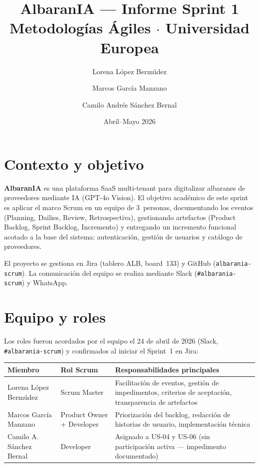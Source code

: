 \documentclass[11pt,a4paper]{article}
\title{\textbf{AlbaranIA} --- Informe Sprint 1 \\ \large Metodologías Ágiles $\cdot$ Universidad Europea}
\author{Lorena López Bermúdez \and Marcos García Manzano \and Camilo Andrés Sánchez Bernal}
\date{Abril--Mayo 2026}
\begin{document}
\maketitle

\section{Contexto y objetivo}

\textbf{AlbaranIA} es una plataforma SaaS multi-tenant para digitalizar albaranes de proveedores mediante IA (GPT-4o Vision). El objetivo académico de este sprint es aplicar el marco Scrum en un equipo de 3~personas, documentando los eventos (Planning, Dailies, Review, Retrospectiva), gestionando artefactos (Product Backlog, Sprint Backlog, Incremento) y entregando un incremento funcional acotado a la base del sistema: autenticación, gestión de usuarios y catálogo de proveedores.

El proyecto se gestiona en Jira (tablero ALB, board~133) y GitHub (\texttt{albarania-scrum}). La comunicación del equipo se realiza mediante Slack (\texttt{\#albarania-scrum}) y WhatsApp.

\section{Equipo y roles}

Los roles fueron acordados por el equipo el 24 de abril de 2026 (Slack, \texttt{\#albarania-scrum}) y confirmados al iniciar el Sprint~1 en Jira:

\begin{center}
\begin{tabular}{llp{7cm}}
\toprule
\textbf{Miembro} & \textbf{Rol Scrum} & \textbf{Responsabilidades principales} \\
\midrule
Lorena López Bermúdez & Scrum Master & Facilitación de eventos, gestión de impedimentos, criterios de aceptación, transparencia de artefactos \\
Marcos García Manzano & Product Owner + Developer & Priorización del backlog, redacción de historias de usuario, implementación técnica \\
Camilo A. Sánchez Bernal & Developer & Asignado a US-04 y US-06 (sin participación activa --- impedimento documentado) \\
\bottomrule
\end{tabular}
\end{center}
\end{document}
